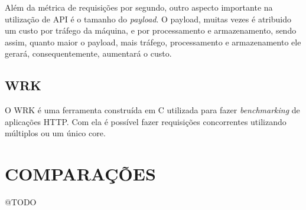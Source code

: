 Além da métrica de requisições por segundo, outro aspecto importante na utilização de API
é o tamanho do \textit{payload}. O payload, muitas vezes é atribuido um custo por 
tráfego da máquina, e por processamento e armazenamento, sendo assim, quanto maior
o payload, mais tráfego, processamento e armazenamento ele gerará, consequentemente,
aumentará o custo. 

\subsection{WRK}

O WRK é uma ferramenta construída em C utilizada para fazer \textit{benchmarking} de 
aplicações HTTP. Com ela é possível fazer requisições concorrentes utilizando 
múltiplos ou um único core.

\section{COMPARAÇÕES}
@TODO